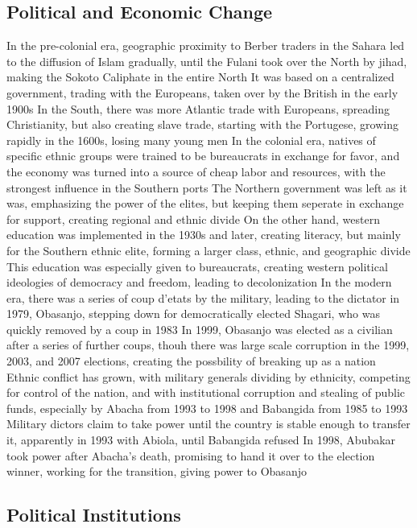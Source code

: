 \documentclass[11 pt, twoside]{article}
\newenvironment{outline*}
{
	\begin{outline}[enumerate]
	}
	{\end{outline}
}
\begin{document}
\subsection{Political and Economic Change}
\begin{outline*}
\1 In the pre-colonial era, geographic proximity to Berber traders in the Sahara led to the diffusion of Islam gradually, until the Fulani took over the North by jihad, making the Sokoto Caliphate in the entire North
\2 It was based on a centralized government, trading with the Europeans, taken over by the British in the early 1900s
\2 In the South, there was more Atlantic trade with Europeans, spreading Christianity, but also creating slave trade, starting with the Portugese, growing rapidly in the 1600s, losing many young men
\1 In the colonial era, natives of specific ethnic groups were trained to be bureaucrats in exchange for favor, and the economy was turned into a source of cheap labor and resources, with the strongest influence in the Southern ports
\2 The Northern government was left as it was, emphasizing the power of the elites, but keeping them seperate in exchange for support, creating regional and ethnic divide
\2 On the other hand, western education was implemented in the 1930s and later, creating literacy, but mainly for the Southern ethnic elite, forming a larger class, ethnic, and geographic divide
\3 This education was especially given to bureaucrats, creating western political ideologies of democracy and freedom, leading to decolonization
\1 In the modern era, there was a series of coup d'etats by the military, leading to the dictator in 1979, Obasanjo, stepping down for democratically elected Shagari, who was quickly removed by a coup in 1983
\2 In 1999, Obasanjo was elected as a civilian after a series of further coups, thouh there was large scale corruption in the 1999, 2003, and 2007 elections, creating the possbility of breaking up as a nation
\2 Ethnic conflict has grown, with military generals dividing by ethnicity, competing for control of the nation, and with institutional corruption and stealing of public funds, especially by Abacha from 1993 to 1998 and Babangida from 1985 to 1993
\2 Military dictors claim to take power until the country is stable enough to transfer it, apparently in 1993 with Abiola, until Babangida refused
\3 In 1998, Abubakar took power after Abacha's death, promising to hand it over to the election winner, working for the transition, giving power to Obasanjo
\end{outline*}
\subsection{Political Institutions}
\end{document}
